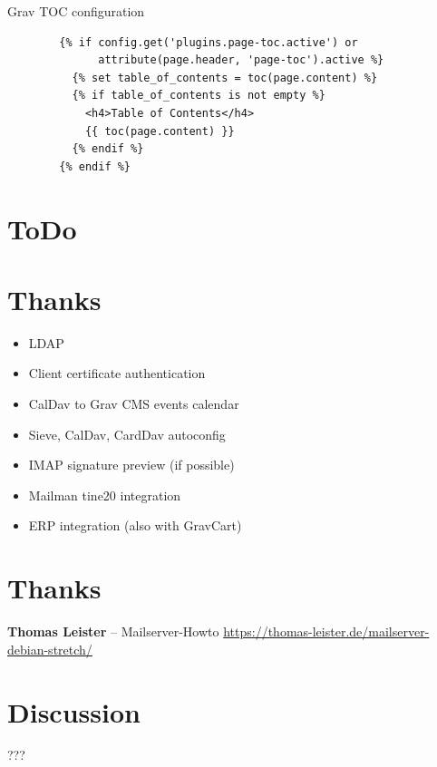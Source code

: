 \documentclass{beamer}
\begin{document}
\begin{frame}[fragile]{\insertsection}{\insertsubsection}
	Grav TOC configuration
	\begin{verbatim}
		{% if config.get('plugins.page-toc.active') or
		      attribute(page.header, 'page-toc').active %}
		  {% set table_of_contents = toc(page.content) %}
		  {% if table_of_contents is not empty %}
			<h4>Table of Contents</h4>
			{{ toc(page.content) }}
		  {% endif %}
		{% endif %}
	\end{verbatim}
\end{frame}

\section{ToDo}
\section{Thanks}
\begin{frame}[fragile]{\insertsection}{\insertsubsection}
	\begin{itemize}
		\item LDAP
		\item Client certificate authentication
		\item CalDav to Grav CMS events calendar
		\item Sieve, CalDav, CardDav autoconfig
		\item IMAP signature preview (if possible)
		\item Mailman tine20 integration
		\item ERP integration (also with GravCart)
	\end{itemize}
\end{frame}

\section{Thanks}
\begin{frame}[fragile]{\insertsection}{\insertsubsection}
	\textbf{Thomas Leister} -- Mailserver-Howto
	\url{https://thomas-leister.de/mailserver-debian-stretch/}
\end{frame}

\section{Discussion}
\begin{frame}[fragile]{\insertsection}{\insertsubsection} %
  \Huge{???}	
\end{frame}	
\end{document}
